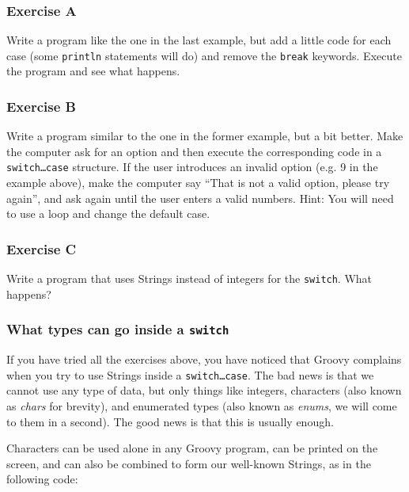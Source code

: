 \subsubsection*{Exercise A}

Write a program like the one in the last example, but add a little
code for each case (some \texttt{println} statements will do) and
remove the \texttt{break} keywords. Execute the program and see what
happens. 

\subsubsection*{Exercise B}

Write a program similar to the one in the former example, but a bit
better. Make the computer ask for an option and then execute the
corresponding code in a \texttt{switch\ldots case} structure. If the
user introduces an invalid option (e.g. 9 in the example above), make
the computer say ``That is not a valid option, please try again'', and
ask again until the user enters a valid numbers. Hint: You will need
to use a loop and change the default case. 

\subsubsection*{Exercise C}

Write a program that uses Strings instead of integers for the
\texttt{switch}. What happens?

\subsubsection{What types can go inside a \texttt{switch}}
\label{sec:what-types-can}

If you have tried all the exercises above, you have noticed that
Groovy complains when you try to use Strings inside a
\texttt{switch\ldots case}. The bad news is that we cannot use any
type of data, but only things like integers, characters (also known as
\emph{chars} for brevity), and enumerated types (also known as
\emph{enums}, we will come to them in a second). The good news is that
this is usually enough.

Characters can be used alone in any Groovy program, can be printed on
the screen, and can also be
combined to form our well-known Strings, as in the following code: 


